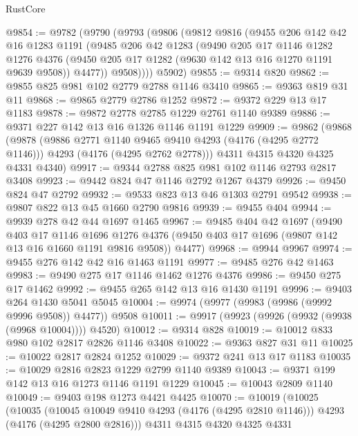 \begin{lexlean}{RustCore}
\begin{coremodule}
@9854 := @9782
    (@9790
      (@9793
        (@9806
          (@9812
            @9816
            (@9455
              @206
              @142
              @42
              @16
              @1283
              @1191
              (@9485
                @206
                @42
                @1283
                (@9490
                  @205
                  @17
                  @1146
                  @1282
                  @1276
                  @4376
                  (@9450 @205 @17 @1282 (@9630 @142 @13 @16 @1270 @1191 @9639 @9508))
                  @4477))
              @9508))))
      @5902)
@9855 := @9314 @820
@9862 := @9855 @825 @981 @102 @2779 @2788 @1146 @3410
@9865 := @9363 @819 @31 @11
@9868 := @9865 @2779 @2786 @1252
@9872 := @9372 @229 @13 @17 @1183
@9878 := @9872 @2778 @2785 @1229 @2761 @1140 @9389
@9886 := @9371 @227 @142 @13 @16 @1326 @1146 @1191 @1229
@9909 := @9862
    (@9868
      (@9878
        (@9886 @2771 @1140 @9465 @9410 @4293 (@4176 (@4295 @2772 @1146)))
        @4293
        (@4176 (@4295 @2762 @2778)))
      @4311
      @4315
      @4320
      @4325
      @4331
      @4340)
@9917 := @9344 @2788 @825 @981 @102 @1146 @2793 @2817 @3408
@9923 := @9442 @824 @47 @1146 @2792 @1267 @4379
@9926 := @9450 @824 @47 @2792
@9932 := @9533 @823 @13 @46 @1303 @2791 @9542
@9938 := @9807 @822 @13 @45 @1660 @2790 @9816
@9939 := @9455 @404
@9944 := @9939 @278 @42 @44 @1697 @1465
@9967 := @9485
    @404
    @42
    @1697
    (@9490
      @403
      @17
      @1146
      @1696
      @1276
      @4376
      (@9450 @403 @17 @1696 (@9807 @142 @13 @16 @1660 @1191 @9816 @9508))
      @4477)
@9968 := @9944 @9967
@9974 := @9455 @276 @142 @42 @16 @1463 @1191
@9977 := @9485 @276 @42 @1463
@9983 := @9490 @275 @17 @1146 @1462 @1276 @4376
@9986 := @9450 @275 @17 @1462
@9992 := @9455 @265 @142 @13 @16 @1430 @1191
@9996 := @9403 @264 @1430 @5041 @5045
@10004 := @9974 (@9977 (@9983 (@9986 (@9992 @9996 @9508)) @4477)) @9508
@10011 := @9917 (@9923 (@9926 (@9932 (@9938 (@9968 @10004)))) @4520)
@10012 := @9314 @828
@10019 := @10012 @833 @980 @102 @2817 @2826 @1146 @3408
@10022 := @9363 @827 @31 @11
@10025 := @10022 @2817 @2824 @1252
@10029 := @9372 @241 @13 @17 @1183
@10035 := @10029 @2816 @2823 @1229 @2799 @1140 @9389
@10043 := @9371 @199 @142 @13 @16 @1273 @1146 @1191 @1229
@10045 := @10043 @2809 @1140
@10049 := @9403 @198 @1273 @4421 @4425
@10070 := @10019
    (@10025
      (@10035
        (@10045 @10049 @9410 @4293 (@4176 (@4295 @2810 @1146)))
        @4293
        (@4176 (@4295 @2800 @2816)))
      @4311
      @4315
      @4320
      @4325
      @4331

\end{coremodule}
\end{lexlean}

